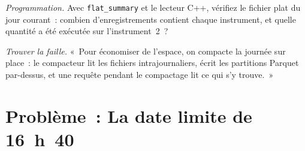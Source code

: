 \begin{exercise}[$\star\star\star$]\label{exo:pl:a-tick-store-on-open-formats:7}
\emph{Programmation.} Avec \texttt{flat\_summary} et le lecteur C++, vérifiez le fichier plat du jour courant~: combien d'enregistrements contient chaque
instrument, et quelle quantité a été exécutée sur l'instrument~2~?
\end{exercise}

\begin{exercise}[$\star\star\star$]\label{exo:pl:a-tick-store-on-open-formats:8}
\emph{Trouver la faille.} «~Pour économiser de l'espace, on compacte la journée sur place~: le compacteur lit les fichiers intrajournaliers, écrit les partitions Parquet
par-dessus, et une requête pendant le compactage lit ce qui s'y trouve.~»
\end{exercise}

\section{Problème~: La date limite de 16~h~40}


